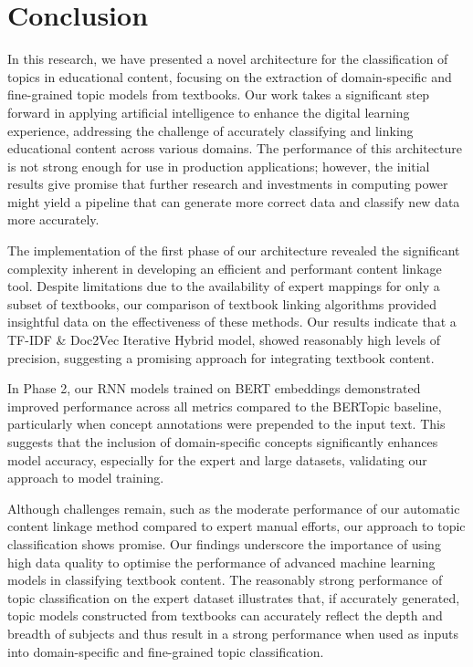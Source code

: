 \documentclass[twocolumn]{article}
\begin{document}
\section{Conclusion} \label{sec:conclusion}
In this research, we have presented a novel architecture for the classification of topics in educational content, focusing on the extraction of domain-specific and fine-grained topic models from textbooks. Our work takes a significant step forward in applying artificial intelligence to enhance the digital learning experience, addressing the challenge of accurately classifying and linking educational content across various domains. The performance of this architecture is not strong enough for use in production applications; however, the initial results give promise that further research and investments in computing power might yield a pipeline that can generate more correct data and classify new data more accurately.

The implementation of the first phase of our architecture revealed the significant complexity inherent in developing an efficient and performant content linkage tool. Despite limitations due to the availability of expert mappings for only a subset of textbooks, our comparison of textbook linking algorithms provided insightful data on the effectiveness of these methods. Our results indicate that a TF-IDF \& Doc2Vec Iterative Hybrid model, showed reasonably high levels of precision, suggesting a promising approach for integrating textbook content.

In Phase 2, our RNN models trained on BERT embeddings demonstrated improved performance across all metrics compared to the BERTopic baseline, particularly when concept annotations were prepended to the input text. This suggests that the inclusion of domain-specific concepts significantly enhances model accuracy, especially for the expert and large datasets, validating our approach to model training.

Although challenges remain, such as the moderate performance of our automatic content linkage method compared to expert manual efforts, our approach to topic classification shows promise. Our findings underscore the importance of using high data quality to optimise the performance of advanced machine learning models in classifying textbook content. The reasonably strong performance of topic classification on the expert dataset illustrates that, if accurately generated, topic models constructed from textbooks can accurately reflect the depth and breadth of subjects and thus result in a strong performance when used as inputs into domain-specific and fine-grained topic classification.
\end{document}
